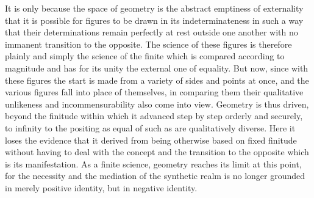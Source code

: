 It is only because the space of geometry is
the abstract emptiness of externality
that it is possible for figures
to be drawn in its indeterminateness
in such a way that their determinations
remain perfectly at rest outside one another
with no immanent transition to the opposite.
The science of these figures is therefore
plainly and simply the science of the finite
which is compared according to magnitude
and has for its unity the external one of equality.
But now, since with these figures the start
is made from a variety of sides and points at once,
and the various figures fall into place of themselves,
in comparing them their qualitative unlikeness
and incommensurability also come into view.
Geometry is thus driven,
beyond the finitude within which
it advanced step by step orderly and securely,
to infinity to the positing as equal
of such as are qualitatively diverse.
Here it loses the evidence that it derived from
being otherwise based on fixed finitude
without having to deal with the concept
and the transition to the opposite
which is its manifestation.
As a finite science, geometry reaches its limit at this point,
for the necessity and the mediation of the synthetic realm is
no longer grounded in merely positive identity,
but in negative identity.

